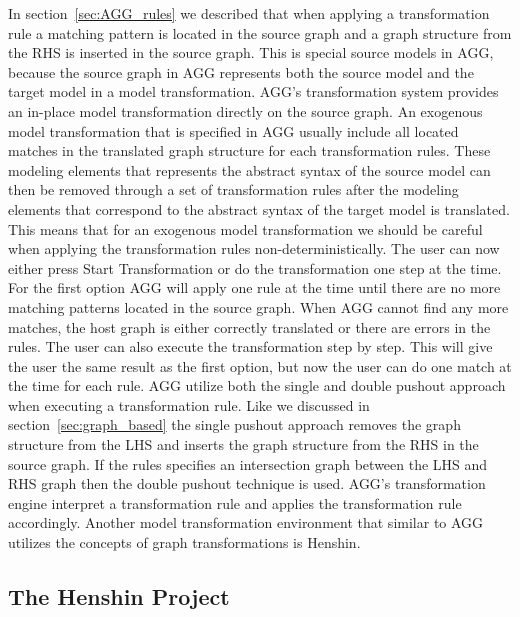 In section~\ref{sec:AGG_rules} we described that when applying a transformation
rule a matching pattern is located in the source graph and a graph structure
from the RHS is inserted in the source graph. This is special source models in
AGG, because the source graph in AGG represents both the source model and the
target model in a model transformation. AGG's transformation system provides an
in-place model transformation directly on the source graph. An exogenous model
transformation that is specified in AGG usually include all located matches in
the translated graph structure for each transformation rules. These modeling
elements that represents the abstract syntax of the source model can then be
removed through a set of transformation rules after the modeling elements
that correspond to the abstract syntax of the target model is translated. This
means that for an exogenous model transformation we should be careful when
applying the transformation rules non-deterministically. The user can now
either press Start Transformation or do the transformation one step at the
time. For the first option AGG will apply one rule at the time until there are
no more matching patterns located in the source graph. When AGG cannot find
any more matches, the host graph is either correctly translated or there are
errors in the rules. The user can also execute the transformation step by step.
This will give the user the same result as the first option, but now the user
can do one match at the time for each rule. AGG utilize both the single and
double pushout approach when executing a transformation
rule\cite{Taentzer2004}. Like we discussed in section~\ref{sec:graph_based} the
single pushout approach removes the graph structure from the LHS and inserts the
graph structure from the RHS in the source graph. If the rules specifies an
intersection graph between the LHS and RHS graph then the double pushout
technique is used. AGG's transformation engine interpret a transformation rule
and applies the transformation rule accordingly. Another model transformation
environment that similar to AGG utilizes the concepts of graph transformations
is Henshin.

\subsection{The Henshin Project}

